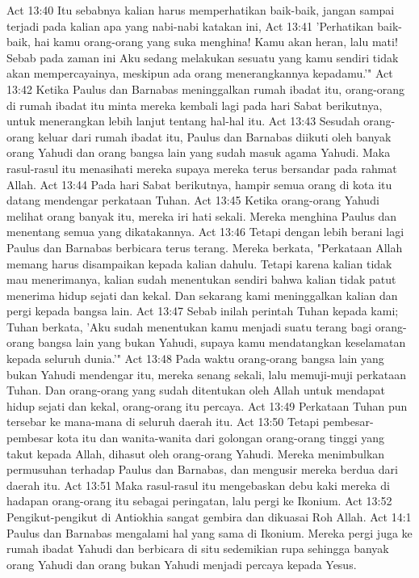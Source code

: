Act 13:40  Itu sebabnya kalian harus memperhatikan baik-baik, jangan sampai terjadi pada kalian apa yang nabi-nabi katakan ini,
Act 13:41  'Perhatikan baik-baik, hai kamu orang-orang yang suka menghina! Kamu akan heran, lalu mati! Sebab pada zaman ini Aku sedang melakukan sesuatu yang kamu sendiri tidak akan mempercayainya, meskipun ada orang menerangkannya kepadamu.'"
Act 13:42  Ketika Paulus dan Barnabas meninggalkan rumah ibadat itu, orang-orang di rumah ibadat itu minta mereka kembali lagi pada hari Sabat berikutnya, untuk menerangkan lebih lanjut tentang hal-hal itu.
Act 13:43  Sesudah orang-orang keluar dari rumah ibadat itu, Paulus dan Barnabas diikuti oleh banyak orang Yahudi dan orang bangsa lain yang sudah masuk agama Yahudi. Maka rasul-rasul itu menasihati mereka supaya mereka terus bersandar pada rahmat Allah.
Act 13:44  Pada hari Sabat berikutnya, hampir semua orang di kota itu datang mendengar perkataan Tuhan.
Act 13:45  Ketika orang-orang Yahudi melihat orang banyak itu, mereka iri hati sekali. Mereka menghina Paulus dan menentang semua yang dikatakannya.
Act 13:46  Tetapi dengan lebih berani lagi Paulus dan Barnabas berbicara terus terang. Mereka berkata, "Perkataan Allah memang harus disampaikan kepada kalian dahulu. Tetapi karena kalian tidak mau menerimanya, kalian sudah menentukan sendiri bahwa kalian tidak patut menerima hidup sejati dan kekal. Dan sekarang kami meninggalkan kalian dan pergi kepada bangsa lain.
Act 13:47  Sebab inilah perintah Tuhan kepada kami; Tuhan berkata, 'Aku sudah menentukan kamu menjadi suatu terang bagi orang-orang bangsa lain yang bukan Yahudi, supaya kamu mendatangkan keselamatan kepada seluruh dunia.'"
Act 13:48  Pada waktu orang-orang bangsa lain yang bukan Yahudi mendengar itu, mereka senang sekali, lalu memuji-muji perkataan Tuhan. Dan orang-orang yang sudah ditentukan oleh Allah untuk mendapat hidup sejati dan kekal, orang-orang itu percaya.
Act 13:49  Perkataan Tuhan pun tersebar ke mana-mana di seluruh daerah itu.
Act 13:50  Tetapi pembesar-pembesar kota itu dan wanita-wanita dari golongan orang-orang tinggi yang takut kepada Allah, dihasut oleh orang-orang Yahudi. Mereka menimbulkan permusuhan terhadap Paulus dan Barnabas, dan mengusir mereka berdua dari daerah itu.
Act 13:51  Maka rasul-rasul itu mengebaskan debu kaki mereka di hadapan orang-orang itu sebagai peringatan, lalu pergi ke Ikonium.
Act 13:52  Pengikut-pengikut di Antiokhia sangat gembira dan dikuasai Roh Allah.
Act 14:1  Paulus dan Barnabas mengalami hal yang sama di Ikonium. Mereka pergi juga ke rumah ibadat Yahudi dan berbicara di situ sedemikian rupa sehingga banyak orang Yahudi dan orang bukan Yahudi menjadi percaya kepada Yesus.
